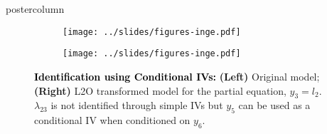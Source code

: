 \documentclass{beamer}
\begin{document}
\begin{frame}
\begin{columns}
\begin{column}{.33\textwidth}
\begin{beamercolorbox}[center]{postercolumn}
\begin{minipage}{.98\textwidth}
{\begin{myblock}{}
\begin{figure}
\begin{subfigure}{0.5 \linewidth}
								\centering
								\texttt{[image: ../slides/figures-inge.pdf]}
							\end{subfigure}%
							\begin{subfigure}{0.5 \linewidth}
								\centering
								\texttt{[image: ../slides/figures-inge.pdf]}
							\end{subfigure}
							\caption*{\textbf{\textcolor{black}{Identification using Conditional IVs:}} \textbf{(Left)} Original model;
									\textbf{(Right)} L2O transformed model for the partial equation, $ y_3 = l_2 $. $ \lambda_{23} $ is not 
									identified through simple IVs but $y_5$ can be used as a conditional IV when conditioned on $ y_6 $.}						\end{figure}
					\end{myblock}\vfill
 				}
			\end{minipage}
		\end{beamercolorbox}
	\end{column}



\end{columns}
\end{frame}
\end{document}
